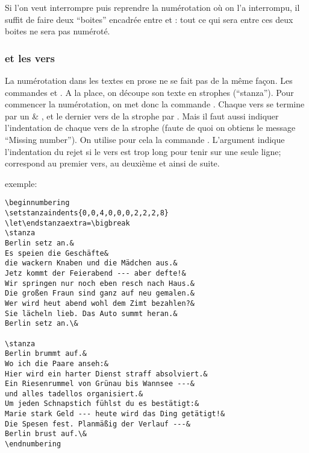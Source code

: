 
Si l'on veut interrompre puis reprendre la numérotation où on l'a interrompu, il suffit de faire deux \enquote{boites} encadrée entre  et :  tout ce qui sera entre ces deux boites ne sera pas numéroté.

\subsubsection{ et les vers}

La  numérotation dans les textes en prose ne se fait pas de la même façon. Les commandes  et . A la place, on découpe son texte en strophes (\enquote{stanza}). Pour commencer la numérotation, on met donc la commande . Chaque vers se termine par un & , et le dernier vers de la strophe par \cs{&}.  Mais il faut aussi indiquer l'indentation de chaque vers de la strophe (faute de quoi on obtiens le message \enquote{Missing number}). On utilise pour cela la commande . L'argument  indique l'indentation du rejet si le vers est trop long pour tenir sur une seule ligne;  correspond au premier vers,  au deuxième et ainsi de suite.


exemple: 

\begin{verbatim}
\beginnumbering
\setstanzaindents{0,0,4,0,0,0,2,2,2,8}
\let\endstanzaextra=\bigbreak
\stanza
Berlin setz an.&
Es speien die Geschäfte&
die wackern Knaben und die Mädchen aus.&
Jetz kommt der Feierabend --- aber defte!&
Wir springen nur noch eben resch nach Haus.&
Die großen Fraun sind ganz auf neu gemalen.&
Wer wird heut abend wohl dem Zimt bezahlen?&
Sie lächeln lieb. Das Auto summt heran.&
Berlin setz an.\&

\stanza
Berlin brummt auf.&
Wo ich die Paare anseh:&
Hier wird ein harter Dienst straff absolviert.&
Ein Riesenrummel von Grünau bis Wannsee ---&
und alles tadellos organisiert.&
Um jeden Schnapstich fühlst du es bestätigt:&
Marie stark Geld --- heute wird das Ding getätigt!&
Die Spesen fest. Planmäßig der Verlauf ---&
Berlin brust auf.\&
\endnumbering
\end{verbatim}

